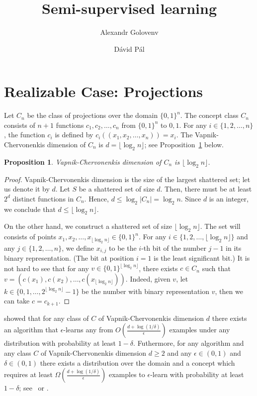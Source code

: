 \documentclass[12pt]{article}
\title{Semi-supervised learning}
\author{Alexandr Golovenv \and D\'avid P\'al}
\newtheorem{proposition}{Proposition}
\begin{document}
\maketitle

\section{Realizable Case: Projections}

Let $C_n$ be the class of projections over the domain $\{0,1\}^n$. The concept
class $C_n$ consists of $n+1$ functions $c_1, c_2, \dots, c_n$ from $\{0,1\}^n$
to ${0,1}$. For any $i \in \{1,2,\dots,n\}$, the function $c_i$ is defined by $c_i((x_1, x_2,
\dots, x_n)) = x_i$. The Vapnik-Chervonenkis dimension of $C_n$ is $d = \lfloor
\log_2 n \rfloor$; see Proposition~\ref{proposition:vc-dimension-projections}
below.

\begin{proposition}
\label{proposition:vc-dimension-projections}
Vapnik-Chervonenkis dimension of $C_n$ is $\lfloor \log_2 n \rfloor$.
\end{proposition}

\begin{proof}
Vapnik-Chervonenkis dimension is the size of the largest shattered set; let us
denote it by $d$. Let $S$ be a shattered set of size $d$. Then, there must be at
least $2^d$ distinct functions in $C_n$. Hence, $d \le \log_2 |C_n| =
\log_2 n$. Since $d$ is an integer, we conclude that $d \le \lfloor \log_2 n
\rfloor$.

On the other hand, we construct a shattered set of size $\lfloor \log_2 n
\rfloor$. The set will consists of points $x_1, x_2, \dots, x_{\lfloor
\log_2 n \rfloor} \in \{0,1\}^n$. For any $i \in \{1,2,\dots,\lfloor \log_2 n \rfloor\}$
and any $j \in \{1,2,\dots,n\}$, we define $x_{i,j}$ to be the $i$-th bit of
the number $j-1$ in its binary representation. (The bit at position $i=1$ is the least significant bit.)
It is not hard to see that for any $v \in \{0,1\}^{\lfloor \log_2 n
\rfloor}$, there exists $c \in C_n$ such that $v = (c(x_1), c(x_2), \dots,
c(x_{\lfloor \log_2 n \rfloor}))$. Indeed, given $v$, let $k \in \{0,1,\dots,2^{\lfloor \log_2 n
\rfloor} - 1\}$ be the number with binary representation $v$,
then we can take $c = c_{k+1}$.
\end{proof}

\cite{Hanneke-2016} showed that for any class of $C$ of Vapnik-Chervonenkis
dimension $d$ there exists an algorithm that $\epsilon$-learns any from
$O\left(\frac{d + \log(1/\delta)}{\epsilon}\right)$ examples under any
distribution with probability at least $1-\delta$. Futhermore, for any algorithm
and any class $C$ of Vapnik-Chervonenkis dimension $d \ge 2$ and any $\epsilon
\in (0,1)$ and $\delta \in (0,1)$ there exists a distribution over the domain
and a concept which requires at least $\Omega \left(\frac{d +
\log(1/\delta)}{\epsilon}\right)$ examples to $\epsilon$-learn with probability
at least $1 - \delta$; see~\cite[Theorem 5.3]{Anthony-Bartlett-1999} or
\cite{Blumer-Ehrenfeucht-Haussler-Warmuth-1989,
Ehrenfeucht-Haussler-Kearns-Valiant-1989}.
\end{document}
